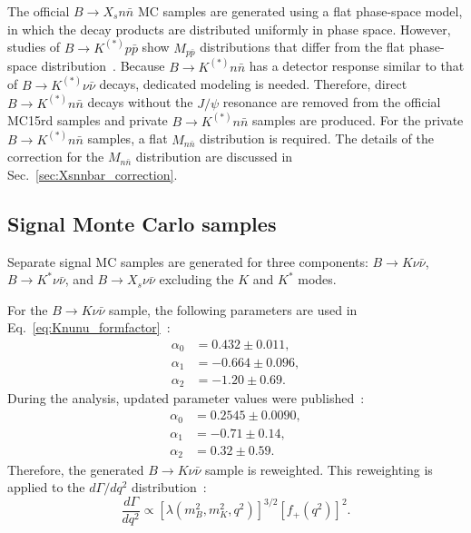 The official $B\to X_{s}n\bar{n}$ MC samples are generated using a flat phase-space model, in which the decay products are distributed uniformly in phase space.
However, studies of $B\to K^{(*)}p\bar{p}$ show $M_{p\bar{p}}$ distributions that differ from the flat phase-space distribution~\cite{Belle:2007oni,Belle:2008zkc,BaBar:2007esv}.
Because $B\to K^{(*)}n\bar{n}$ has a detector response similar to that of $B\to K^{(*)}\nu\bar{\nu}$ decays, dedicated modeling is needed.
Therefore, direct $B\to K^{(*)}n\bar{n}$ decays without the $J/\psi$ resonance are removed from the official MC15rd samples and private $B\to K^{(*)}n\bar{n}$ samples are produced.
For the private $B\to K^{(*)}n\bar{n}$ samples, a flat $M_{n\bar{n}}$ distribution is required.
The details of the correction for the $M_{n\bar{n}}$ distribution are discussed in Sec.~\ref{sec:Xsnnbar_correction}.

\subsection{Signal Monte Carlo samples}
\label{sec:signal_MC}
Separate signal MC samples are generated for three components: $B\to K\nu\bar{\nu}$, $B\to K^{*}\nu\bar{\nu}$, and $B\to X_s\nu\bar{\nu}$ excluding the $K$ and $K^{*}$ modes.

For the $B\rightarrow K \nu \bar{\nu}$ sample, the following parameters are used in Eq.~\ref{eq:Knunu_formfactor}~\cite{Buras:2014fpa}:
\begin{equation}
  \begin{aligned}
    \alpha_0 &= 0.432 \pm 0.011, \\
    \alpha_1 &= -0.664 \pm 0.096, \\
    \alpha_2 &= -1.20 \pm 0.69.
  \end{aligned}
\end{equation}
During the analysis, updated parameter values were published~\cite{Parrott:2022rgu}:
\begin{equation}
  \label{eq:coeff_Kff}
  \begin{aligned}
    \alpha_0 &= 0.2545 \pm 0.0090, \\
    \alpha_1 &= -0.71 \pm 0.14, \\
    \alpha_2 &= 0.32 \pm 0.59.
  \end{aligned}
\end{equation}
Therefore, the generated $B\rightarrow K\nu\bar{\nu}$ sample is reweighted.
This reweighting is applied to the $d\Gamma/dq^{2}$ distribution~\cite{Buras:2014fpa}:
\begin{equation}
  \frac{d\Gamma}{dq^{2}} \propto
  \left[\lambda(m_{B}^{2},m_{K}^{2},q^{2})\right]^{3/2}
  \left[f_{+}(q^{2})\right]^{2}.
\end{equation}

